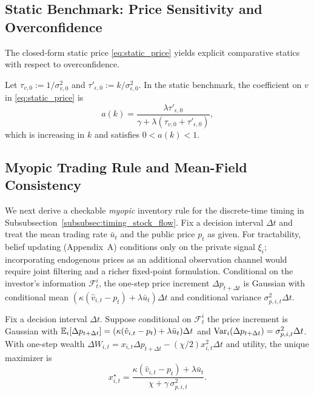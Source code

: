 
\subsection{Static Benchmark: Price Sensitivity and Overconfidence}

The closed-form static price \eqref{eq:static_price} yields explicit comparative statics with respect to overconfidence.

\begin{proposition}
\label{prop:static_comparative}
Let $\tau_{v,0} := 1/\sigma_{v,0}^2$ and $\tau'_{\epsilon,0} := k/\sigma_{\epsilon,0}^2$. In the static benchmark, the coefficient on $v$ in \eqref{eq:static_price} is
\begin{equation}
a(k) = \frac{\lambda \tau'_{\epsilon,0}}{\gamma + \lambda(\tau_{v,0}+\tau'_{\epsilon,0})},
\end{equation}
which is increasing in $k$ and satisfies $0<a(k)<1$.
\end{proposition}

\subsection{Myopic Trading Rule and Mean-Field Consistency}

We next derive a checkable \emph{myopic} inventory rule for the discrete-time timing in Subsubsection~\ref{subsubsec:timing_stock_flow}. Fix a decision interval $\Delta t$ and treat the mean trading rate $\bar u_t$ and the public price $p_t$ as given. For tractability, belief updating (Appendix~A) conditions only on the private signal $\xi_i$; incorporating endogenous prices as an additional observation channel would require joint filtering and a richer fixed-point formulation. Conditional on the investor's information $\mathcal F^i_t$, the one-step price increment $\Delta p_{t+\Delta t}$ is Gaussian with conditional mean $(\kappa(\hat v_{i,t}-p_t)+\lambda \bar u_t)\Delta t$ and conditional variance $\sigma^2_{p,i,t}\Delta t$.

\begin{proposition}
\label{prop:myopic_cara}
Fix a decision interval $\Delta t$. Suppose conditional on $\mathcal F^i_t$ the price increment is Gaussian with
$\mathbb{E}_i[\Delta p_{t+\Delta t}]=(\kappa(\hat v_{i,t}-p_t)+\lambda\bar u_t)\Delta t$ and
$\text{Var}_i(\Delta p_{t+\Delta t})=\sigma^2_{p,i,t}\Delta t$.
With one-step wealth $\Delta W_{i,t}=x_{i,t}\Delta p_{t+\Delta t}-(\chi/2)x_{i,t}^2\Delta t$ and \CARA utility, the unique maximizer is
\begin{equation}
x^\star_{i,t} = \frac{\kappa(\hat v_{i,t}-p_t)+\lambda\bar u_t}{\chi+\gamma\,\sigma^2_{p,i,t}}.
\label{eq:myopic_policy}
\end{equation}
\end{proposition}

